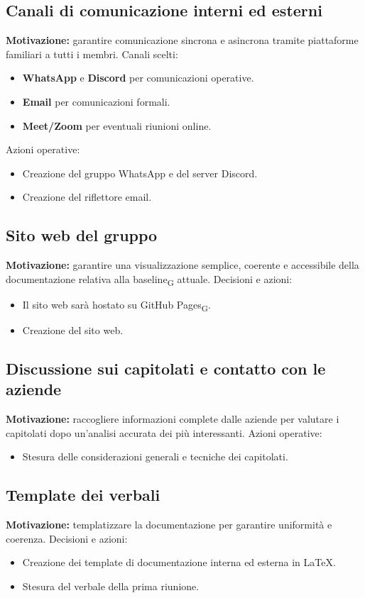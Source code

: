 \subsection{Canali di comunicazione interni ed esterni}
\textbf{Motivazione:} garantire comunicazione sincrona e asincrona tramite piattaforme familiari a tutti i membri.  
Canali scelti:
\begin{itemize}
    \item \textbf{WhatsApp} e \textbf{Discord} per comunicazioni operative.
    \item \textbf{Email} per comunicazioni formali.
    \item \textbf{Meet/Zoom} per eventuali riunioni online.
\end{itemize}
Azioni operative:
\begin{itemize}
    \item Creazione del gruppo WhatsApp e del server Discord.
    \item Creazione del riflettore email.
\end{itemize}

\subsection{Sito web del gruppo}
\textbf{Motivazione:} garantire una visualizzazione semplice, coerente e accessibile della documentazione relativa alla baseline\textsubscript{G} attuale.  
Decisioni e azioni:
\begin{itemize}
    \item Il sito web sarà hostato su GitHub Pages\textsubscript{G}.
    \item Creazione del sito web.
\end{itemize}

\subsection{Discussione sui capitolati e contatto con le aziende}
\textbf{Motivazione:} raccogliere informazioni complete dalle aziende per valutare i capitolati dopo un’analisi accurata dei più interessanti.  
Azioni operative:
\begin{itemize}
    \item Stesura delle considerazioni generali e tecniche dei capitolati.
\end{itemize}

\subsection{Template dei verbali}
\textbf{Motivazione:} templatizzare la documentazione per garantire uniformità e coerenza.  
Decisioni e azioni:
\begin{itemize}
    \item Creazione dei template di documentazione interna ed esterna in LaTeX.
    \item Stesura del verbale della prima riunione.
\end{itemize}

